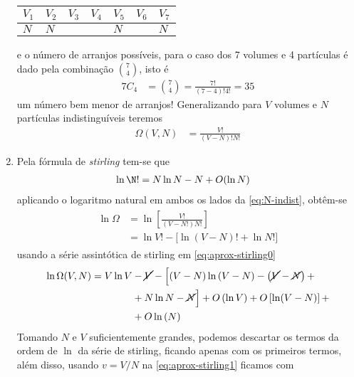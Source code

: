 \begin{sol}
\begin{enumerate}[label=\alph *)]
			\begin{table}[!ht]
				\centering
				\begin{tabular}{|l|l|l|l|l|l|l|}
				\hline
				$V_1$ & $V_2$ & $V_3$ & $V_4$ & $V_5$ & $V_6$ & $V_7$ \\ \hline
				$N$   & $N$   &       &       & $N$   &       & $N$   \\ \hline
				\end{tabular}
			\end{table}
			e o número de arranjos possíveis, para o caso dos 7 volumes e 4 partículas é dado pela combinação $7\choose 4$, isto é
			\begin{align}
				7C_4&={7\choose 4}=\frac{7!}{(7-4)!4!}=35
			\end{align}
			um número bem menor de arranjos! Generalizando para $V$ volumes e $N$ partículas indistinguíveis teremos
			\begin{align}
				\label{eq:N-indist}
				\Omega (V,N)&=\frac{V!}{(V-N)!N!}
			\end{align}
			\item Pela fórmula de \emph{stirling} tem-se que
			\begin{align}
				\ln \N!&=N\ln N -N+O(\ln N)
			\end{align}
			aplicando o logaritmo natural em ambos os lados da \eqref{eq:N-indist}, obtêm-se
			\begin{align}
				\begin{split}
					\label{eq:aprox-stirling0}
					\ln \Omega&=\ln\left[\frac{V!}{(V-N!)N!}\right]\\
					&=\ln V!-\biggl[\ln\left(V-N\right)!+\ln N!\biggr]	
				\end{split}				
			\end{align}
			usando a série assintótica de stirling em \eqref{eq:aprox-stirling0}	
			\begin{equation}
				\label{eq:aprox-stirling1}
				\begin{split}
					\ln \Omega(V,N)=V\ln V&-\cancel{V}-\Bigl[\left(V-N\right)\ln\left(V-N\right)-\left(\cancel{V}-\cancel{N}\right)+\\
					&+N\ln N-\cancel{N}\Bigr]+O\left(\ln V\right)+O\left[\ln (V-N)\right]+\\
					&+O\ln\left(N\right)
				\end{split}
			\end{equation}
			Tomando $N$ e $V$ suficientemente grandes, podemos descartar os termos da ordem de $\ln$ da série de stirling, ficando apenas com os primeiros termos, além disso, usando $v=V/N$ na \eqref{eq:aprox-stirling1} ficamos com

\end{enumerate}
\end{sol}
